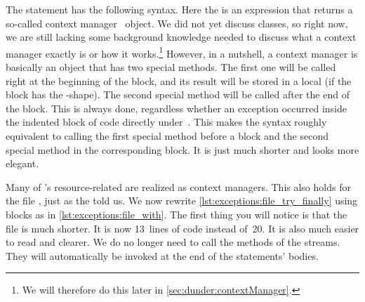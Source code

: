 %
%
The  statement has the following syntax.
Here the  is an expression that returns a so-called context manager~\cite{PSF:P3D:TPLR:WSCM,PSF:P3D:TPSL:CUFWSC,PSF:P3D:TPLR:TWS,PEP343} object.
We did not yet discuss classes, so right now, we are still lacking some background knowledge needed to discuss what a context manager exactly is or how it works.\footnote{%
We will therefore do this later in \cref{sec:dunder:contextManager}.}
However, in a nutshell, a context manager is basically an object that has two special methods.
The first one will be called right at the beginning of the  block, and its result will be stored in a local  (if the  block has the -shape).
The second special method will be called after the end of the  block.
This is always done, regardless whether an exception occurred inside the indented block of code directly under~.%
%
%
\FloatBarrier%
%
This makes the syntax roughly equivalent to calling the first special method before a  block and the second special method in the corresponding  block.
It is just much shorter and looks more elegant.

%
%

Many of \python's resource-related  are realized as context managers.
This also holds for the file  , just as the  told us.
We now rewrite \cref{lst:exceptions:file_try_finally} using  blocks as  in \cref{lst:exceptions:file_with}.
The first thing you will notice is that the file is much shorter.
It is now 13~lines of code instead of~20.
It is also much easier to read and clearer.
We do no longer need to call the  methods of the streams.
They will automatically be invoked at the end of the  statements' bodies.

